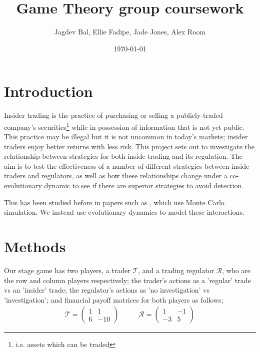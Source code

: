 \documentclass{article}
\title{Game Theory group coursework}
\author{Jagdev Bal, Ellie Fadipe, Jade Jones, Alex Room}
\date{\today}
\begin{document}
\maketitle

\section{Introduction}
Insider trading is the practice of purchasing or selling a publicly-traded company’s securities\footnote{i.e. assets which can be traded} while in possession of information that is not yet public. This practice may be illegal but it is not uncommon in today's markets; insider traders enjoy better returns with less risk. This project sets out to investigate the relationship between strategies for both inside trading and its regulation. The aim is to test the effectiveness of a number of different strategies between inside traders and regulators, as well as how these relationships change under a co-evolutionary dynamic to see if there are superior strategies to avoid detection. 

This has been studied before in papers such as \citet{smales2017game}, which use Monte Carlo simulation. We instead use evolutionary dynamics to model these interactions.

\section{Methods}
Our stage game has two players, a trader $\mathcal{T}$, and a trading regulator $\mathcal{R}$, who are the row and column players respectively; the trader's actions as a 'regular' trade vs an 'insider' trade; the regulator's actions as 'no investigation' vs 'investigation'; and financial payoff matrices for both players as follows;
\begin{equation*}
\begin{split}
    \mathcal{T} = 
    \begin{pmatrix}
    1 & 1 \\
    6 & -10
    \end{pmatrix}
\end{split}
\quad\quad
\begin{split}
    \mathcal{R} = 
    \begin{pmatrix}
    1 & -1 \\
    -3 & 5
    \end{pmatrix}
\end{split}
\end{equation*}
\end{document}
